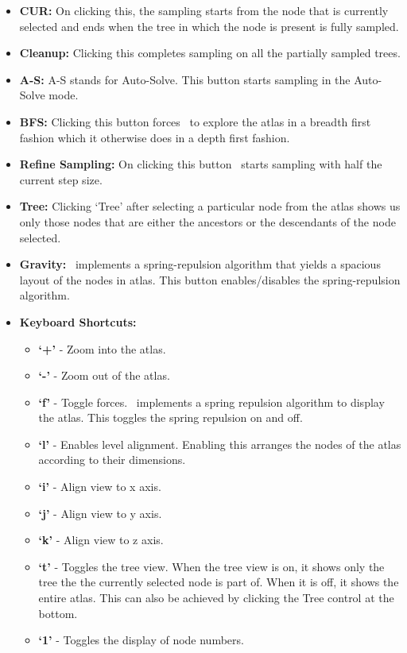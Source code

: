 \documentclass[10pt]{article}
\begin{document}
\begin{itemize}
\item \textbf{CUR:} On clicking this, the sampling starts from the node that is
		currently selected and ends when the tree in which the node is present
		is fully sampled.
\item \textbf{Cleanup:} Clicking this completes sampling on all the partially
		sampled trees.
\item \textbf{A-S:} A-S stands for Auto-Solve. This button starts sampling in
		the Auto-Solve mode.
\item \textbf{BFS:} Clicking this button forces \EASAL~to explore the atlas in
		a breadth first fashion which it otherwise does in a depth first
		fashion.
\item \textbf{Refine Sampling:} On clicking this button \EASAL~starts sampling
		with half the current step size.
\item \textbf{Tree:} Clicking `Tree' after selecting a particular node from the
		atlas shows us only those nodes that are either the ancestors or the
		descendants of the node selected.
\item \textbf{Gravity:} \EASAL~implements a spring-repulsion algorithm that
		yields a spacious layout of the nodes in  atlas. This button
		enables/disables the spring-repulsion algorithm.
\item \textbf{Keyboard Shortcuts:}
		\begin{itemize}
				\item \textbf{`+'} - Zoom into the atlas.
				\item \textbf{`-'} - Zoom out of the atlas.
				\item \textbf{`f'} - Toggle forces. \EASAL~implements a spring
						repulsion algorithm to display the atlas. This toggles
						the spring repulsion on and off.
				\item \textbf{`l'} - Enables level alignment. Enabling this
						arranges the nodes of the atlas according to their
						dimensions.
				\item \textbf{`i'} - Align view to x axis.
				\item \textbf{`j'} - Align view to y axis.
				\item \textbf{`k'} - Align view to z axis.
				\item \textbf{`t'} - Toggles the tree view. When the tree view
						is on, it shows only the tree the the currently
						selected node is part of. When it is off, it shows the
						entire atlas. This can also be achieved by clicking the
						Tree control at the bottom.
				\item \textbf{`1'} - Toggles the display of node numbers.

\end{itemize}
\end{itemize}
\end{document}
